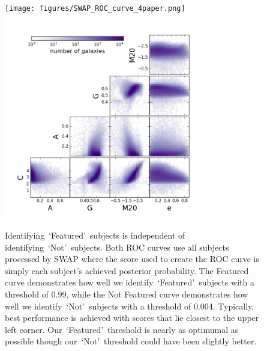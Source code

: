 \documentclass[twocolumn]{aastex6}
\newcommand{\feat}{`Featured'}
\newcommand{\notfeat}{`Not'}
\begin{document}
\begin{figure}[t!]

\texttt{[image: figures/SWAP\_ROC\_curve\_4paper.png]}
\includegraphics[width=3.55in]{figures/morph_params_entire_GZ2_sample.png}
\caption{Identifying~\feat~subjects is independent of identifying~\notfeat~subjects.  Both ROC curves use all subjects processed by SWAP where the score used to create the ROC curve is simply each subject's achieved posterior probability. The Featured curve demonstrates how well we identify~\feat~subjects with a threshold of 0.99, while the Not Featured curve demonstrates how well we identify~\notfeat~subjects with a threshold of 0.004. Typically, best performance is achieved with scores that lie closest to the upper left corner.  Our~\feat~threshold is nearly as optimumal as possible though our~\notfeat~threshold could have been slightly better. \label{fig: retirement thresholds}}
\label{fig: morph thresh}
\end{figure}



\end{document}
